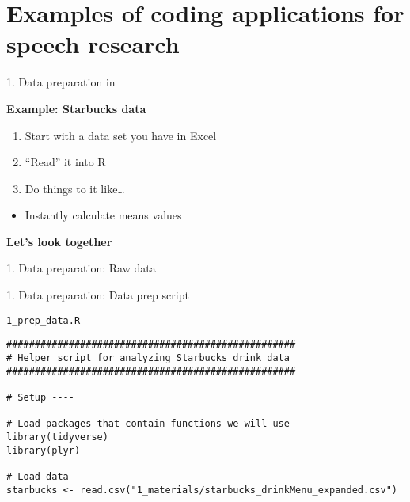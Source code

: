 \documentclass[
  ignorenonframetext,
]{beamer}
\providecommand{\tightlist}{%
  \setlength{\itemsep}{0pt}\setlength{\parskip}{0pt}}
\begin{document}
\hypertarget{examples-of-coding-applications-for-speech-research}{%
\section{Examples of coding applications for speech
research}\label{examples-of-coding-applications-for-speech-research}}

\begin{frame}{1. Data preparation in }
\protect\hypertarget{data-preparation-in}{}

\textbf{Example: Starbucks data}

\begin{enumerate}
\tightlist
\item
  Start with a data set you have in Excel
\item
  ``Read'' it into R
\item
  Do things to it like\ldots{}
\end{enumerate}

\begin{itemize}
\tightlist
\item
  Instantly calculate means values
\end{itemize}

\textbf{Let's look together}

\end{frame}

\begin{frame}{1. Data preparation: Raw data}
\protect\hypertarget{data-preparation-raw-data}{}

\end{frame}

\begin{frame}[fragile]{1. Data preparation: Data prep script}
\protect\hypertarget{data-preparation-data-prep-script}{}

\texttt{1\_prep\_data.R}

\begin{verbatim}
###################################################
# Helper script for analyzing Starbucks drink data
###################################################

# Setup ----

# Load packages that contain functions we will use
library(tidyverse)
library(plyr)

# Load data ----
starbucks <- read.csv("1_materials/starbucks_drinkMenu_expanded.csv")
\end{verbatim}

\end{frame}
\end{document}
